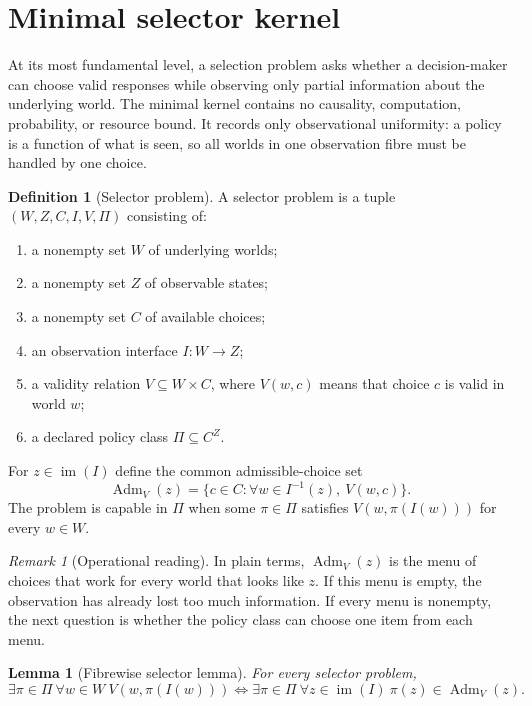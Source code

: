 \documentclass[11pt]{article}
\theoremstyle{plain}
\newtheorem{lemma}[theorem]{Lemma}
\theoremstyle{definition}
\newtheorem{definition}[theorem]{Definition}
\theoremstyle{remark}
\newtheorem{remark}[theorem]{Remark}
\newcommand{\im}{\operatorname{im}}
\newcommand{\Adm}{\operatorname{Adm}}
\begin{document}
\section{Minimal selector kernel}\label{sec:kernel}

At its most fundamental level, a selection problem asks whether a
decision-maker can choose valid responses while observing only partial
information about the underlying world. The minimal kernel contains no causality,
computation, probability, or resource bound. It records only observational
uniformity: a policy is a function of what is seen, so all worlds in one
observation fibre must be handled by one choice.

\begin{definition}[Selector problem]\label{def:selector}
A selector problem is a tuple $(W,Z,C,I,V,\Pi)$ consisting of:
\begin{enumerate}[label=(\roman*)]
\item a nonempty set $W$ of underlying worlds;
\item a nonempty set $Z$ of observable states;
\item a nonempty set $C$ of available choices;
\item an observation interface $I:W\to Z$;
\item a validity relation $V\subseteq W\times C$, where $V(w,c)$ means that
choice $c$ is valid in world $w$;
\item a declared policy class $\Pi\subseteq C^Z$.
\end{enumerate}
For $z\in\im(I)$ define the common admissible-choice set
\[
\Adm_V(z)=\{c\in C:\forall w\in I^{-1}(z),\ V(w,c)\}.
\]
The problem is capable in $\Pi$ when some $\pi\in\Pi$ satisfies
$V(w,\pi(I(w)))$ for every $w\in W$.
\end{definition}

\begin{remark}[Operational reading]
In plain terms, $\Adm_V(z)$ is the menu of choices that work for every world
that looks like $z$. If this menu is empty, the observation has already lost too
much information. If every menu is nonempty, the next question is whether the
policy class can choose one item from each menu.
\end{remark}

\begin{lemma}[Fibrewise selector lemma]\label{lem:selector}
For every selector problem,
\[
\exists\pi\in\Pi\ \forall w\in W\ V(w,\pi(I(w)))
\iff
\exists\pi\in\Pi\ \forall z\in\im(I)\ \pi(z)\in\Adm_V(z).
\]
\end{lemma}
\end{document}
